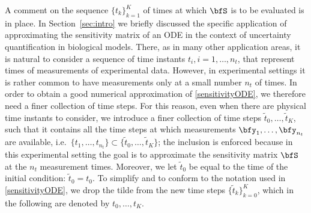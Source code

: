 \documentclass[DIV=12]{scrartcl} %
\theoremstyle{definition}
\begin{document}
A comment on the sequence $\{ t_k\} _{k=1} ^K$ of times at which $\bfS$ is to be evaluated is in place. In Section~\ref{sec:intro} we briefly discussed the specific application of approximating the sensitivity matrix of an ODE in the context of uncertainty quantification in biological models. There, as in many other application areas, it is natural to consider a sequence of time instants $t_i, i=1,\dots, n_t$, that represent times of measurements of experimental data. However, in experimental settings it is rather common to have measurements only at a small number $n_t$ of times. In order to obtain a good numerical approximation of \eqref{sensitivityODE}, we therefore need a finer collection of time steps. For this reason, even when there are physical time instants to consider, we introduce a finer collection of time steps $\tilde{t}_0,\dots,\tilde{t}_K$, such that it contains all the time steps at which measurements $\bfy_1,\dots,\bfy_{n_t}$ are available, i.e.\ $\{t_1,\dots,t_{n_t}\}\subset \{\tilde{t}_0,\dots,\tilde{t}_K\}$; the inclusion is enforced because in this experimental setting the goal is to approximate the sensitivity matrix $\bfS$ at the $n_t$ measurement times. Moreover, we let $\tilde{t}_0$ be equal to the time of the initial condition: $\tilde{t}_0=t_0$. To simplify and to conform to the notation used in \eqref{sensitivityODE}, we drop the tilde from the new time steps $\{\tilde{t}_k\}_{k=0}^K$, which in the following are denoted by $t_0,\dots,t_K$.   
\end{document}
